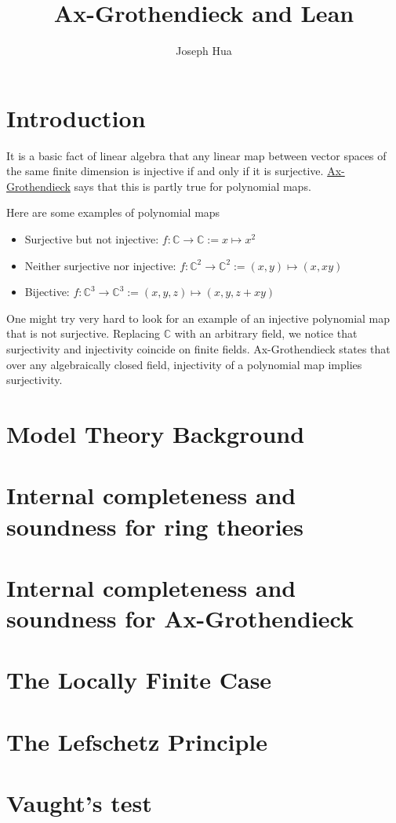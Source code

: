 \documentclass{article}
\newcommand{\C}{\mathbb{C}}
\newcommand{\<}{\langle}
\renewcommand{\>}{\rangle}
\newcommand{\link}[1]{\hypertarget{#1}{}}
\newcommand{\linkto}[2]{\hyperlink{#1}{#2}}
\theoremstyle{definitionstyle}
\theoremstyle{exercisestyle}
\theoremstyle{remarkstyle}
\begin{document}
\title{Ax-Grothendieck and Lean}
\author{Joseph Hua}
\maketitle

\tableofcontents

\section{Introduction}

It is a basic fact of linear algebra that any linear map
between vector spaces of the same finite dimension is
injective if and only if it is surjective.
\linkto{ax_groth_thm}{Ax-Grothendieck} says that this is
partly true for polynomial maps.

Here are some examples of polynomial maps
\begin{itemize}
  \item Surjective but not injective: $f : \C \to \C := x \mapsto x^{2}$
  \item Neither surjective nor injective:
      $f : \C^{2} \to \C^{2} := (x,y) \mapsto (x,xy)$
  \item Bijective:
      $f : \C^{3} \to \C^{3} := (x,y,z) \mapsto ( x , y , z + xy )$
\end{itemize}

One might try very hard to look for an example of an injective polynomial map
that is not surjective.
Replacing $\C$ with an arbitrary field, we notice that
surjectivity and injectivity coincide on finite fields.
Ax-Grothendieck states that over any algebraically closed field,
injectivity of a polynomial map implies surjectivity.

\section{Model Theory Background}


\section{Internal completeness and soundness for ring theories}


\section{Internal completeness and soundness
  for Ax-Grothendieck}


\section{The Locally Finite Case}


\section{The Lefschetz Principle}


\section{Vaught's test}


\link{vaught_proof}



{}

\end{document}
